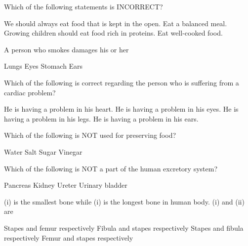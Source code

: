 \begin{questions}
    \question Which of the following statements is INCORRECT?

    \begin{randomizechoices}
        \CorrectChoice We should always eat food that is kept in the open.
        \choice Eat a balanced meal.
        \choice Growing children should eat food rich in proteins.
        \choice Eat well-cooked food.
    \end{randomizechoices}

    \question A person who smokes damages his or her \fillin

    \begin{randomizeoneparchoices}
        \CorrectChoice Lungs
        \choice Eyes
        \choice Stomach
        \choice Ears
    \end{randomizeoneparchoices}

\question Which of the following is correct regarding the person who is suffering from a cardiac problem?

    \begin{randomizechoices}
        \CorrectChoice He is having a problem in his heart.
        \choice He is having a problem in his eyes.
        \choice He is having a problem in his legs.
        \choice He is having a problem in his ears.
    \end{randomizechoices}
    
    \question Which of the following is NOT used for preserving food?

    \begin{randomizeoneparchoices}
        \CorrectChoice Water
        \choice Salt
        \choice Sugar
        \choice Vinegar
    \end{randomizeoneparchoices}

    \question Which of the following is NOT a part of the human excretory system?

    \begin{randomizeoneparchoices}
        \CorrectChoice Pancreas
        \choice Kidney
        \choice Ureter
        \choice Urinary bladder
    \end{randomizeoneparchoices}    

    \question \makebox[0.5cm]{\hrulefill}(i)\makebox[0.5cm]{\hrulefill} is the smallest bone while \makebox[0.5cm]{\hrulefill}(i)\makebox[0.5cm]{\hrulefill} is the longest bone in human body. (i) and (ii) are

    \begin{randomizechoices}
        \CorrectChoice Stapes and femur respectively
        \choice Fibula and stapes respectively
        \choice Stapes and fibula respectively
        \choice Femur and stapes respectively
    \end{randomizechoices}


\end{questions}

